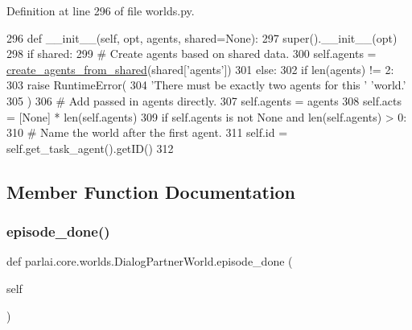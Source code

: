 Definition at line 296 of file worlds.\+py.


\begin{DoxyCode}
296     \textcolor{keyword}{def }\_\_init\_\_(self, opt, agents, shared=None):
297         super().\_\_init\_\_(opt)
298         \textcolor{keywordflow}{if} shared:
299             \textcolor{comment}{# Create agents based on shared data.}
300             self.agents = \hyperlink{namespaceparlai_1_1core_1_1agents_a5600530545f5e60a79e2d657b5af1d8c}{create\_agents\_from\_shared}(shared[\textcolor{stringliteral}{'agents'}])
301         \textcolor{keywordflow}{else}:
302             \textcolor{keywordflow}{if} len(agents) != 2:
303                 \textcolor{keywordflow}{raise} RuntimeError(
304                     \textcolor{stringliteral}{'There must be exactly two agents for this '} \textcolor{stringliteral}{'world.'}
305                 )
306             \textcolor{comment}{# Add passed in agents directly.}
307             self.agents = agents
308         self.acts = [\textcolor{keywordtype}{None}] * len(self.agents)
309         \textcolor{keywordflow}{if} self.agents \textcolor{keywordflow}{is} \textcolor{keywordflow}{not} \textcolor{keywordtype}{None} \textcolor{keywordflow}{and} len(self.agents) > 0:
310             \textcolor{comment}{# Name the world after the first agent.}
311             self.id = self.get\_task\_agent().getID()
312 
\end{DoxyCode}


\subsection{Member Function Documentation}
\mbox{\label{classparlai_1_1core_1_1worlds_1_1DialogPartnerWorld_a2d18d6d327510401b39e4549540e4ada}} 
\subsubsection{\texorpdfstring{episode\+\_\+done()}{episode\_done()}}
{\footnotesize\ttfamily def parlai.\+core.\+worlds.\+Dialog\+Partner\+World.\+episode\+\_\+done (\begin{DoxyParamCaption}\item[{}]{self }\end{DoxyParamCaption})}

